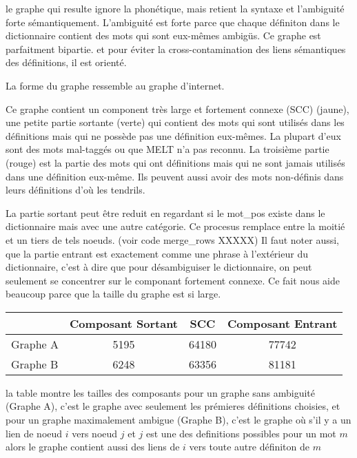 le graphe qui resulte ignore la phonétique, mais retient la syntaxe et
l'ambiguité forte sémantiquement. L'ambiguité est forte parce que chaque
définiton dans le dictionnaire contient des mots qui sont eux-mêmes
ambigüs. Ce graphe est parfaitment bipartie.
et pour éviter la cross-contamination des liens sémantiques des
définitions, il est orienté. 

La forme du graphe ressemble au graphe d'internet.

\begin{figure}
\centering
\parbox{5cm}{
\def\svgscale{0.5}

\caption{}
\label{fig:graph_shocker}}
\end{figure}

Ce graphe contient un component très large et fortement connexe (SCC) (jaune),
une petite partie sortante (verte) qui contient des mots qui sont
utilisés dans les définitions mais qui ne possède pas une définition
eux-mêmes. La plupart d'eux sont des mots mal-taggés ou que MELT n'a
pas reconnu. La troisième partie (rouge) est la partie des mots qui
ont définitions mais qui ne sont jamais utilisés dans une définition
eux-même. Ils peuvent aussi avoir des mots non-définis dans leurs
définitions d'où les tendrils.

La partie sortant peut être reduit en regardant si le mot\_pos existe
dans le dictionnaire mais avec une autre catégorie. Ce procesus remplace
entre la moitié et un tiers de tels noeuds. (voir code merge\_rows XXXXX)
Il faut noter aussi, que la partie entrant est exactement comme une
phrase à l'extérieur du dictionnaire, c'est à dire que pour désambiguiser
le dictionnaire, on peut seulement se concentrer sur le componant
fortement connexe. Ce fait nous aide beaucoup parce que la taille du
graphe est si large.

\begin{tabular}{|l|c|c|c|}
\hline
             & Composant Sortant & SCC   & Composant Entrant \\
\hline
Graphe A     &  5195             & 64180 &  77742            \\
\hline
Graphe B     &  6248             & 63356 &  81181             \\
\hline
\end{tabular}


la table montre les tailles des composants pour un graphe sans ambiguité
(Graphe A), c'est le graphe avec seulement les prémieres définitions
choisies, et pour un graphe maximalement ambigue (Graphe B), c'est le graphe
où s'il y a un lien de noeud $i$ vers noeud $j$ et $j$ est une des
definitions possibles pour un mot $m$ alors le graphe contient aussi des
liens de $i$ vers toute autre définiton de $m$

